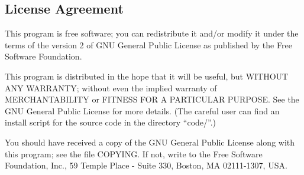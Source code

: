 \documentclass{article}
\begin{document}

\subsection{License Agreement}

This program is free software; you can redistribute it and/or
modify it under the terms of the version 2 of GNU General Public
License as published by the Free Software Foundation.

This program is distributed in the hope that it will be useful,
but WITHOUT ANY WARRANTY; without even the implied warranty of
MERCHANTABILITY or FITNESS FOR A PARTICULAR PURPOSE. See the GNU
General Public License for more details. (The careful user can find
an install script for the source code in the directory ``code/''.)

You should have received a copy of the GNU General Public License
along with this program; see the file COPYING. If not, write to
the Free Software Foundation, Inc., 59 Temple Place - Suite 330,
Boston, MA 02111-1307, USA.
\end{document}
